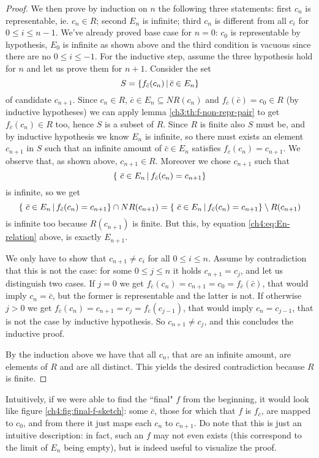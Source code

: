 \begin{proof}
	We then prove by induction on $n$ the following three statements: first $c_n$ is representable, ie. $c_n \in R$; second $E_n$ is infinite; third $c_n$ is different from all $c_i$ for $0 \le i \le n - 1$.
	We've already proved base case for $n = 0$: $c_0$ is representable by hypothesis, $E_0$ is infinite as shown above and the third condition is vacuous since there are no $0 \le i \le -1$.
	For the inductive step, assume the three hypothesis hold for $n$ and let us prove them for $n + 1$.
	Consider the set
	\[
	S = \{ f_{\bar{c}}(c_n) \,\vert\, \bar{c} \in E_n \}
	\]
	of candidate $c_{n+1}$.
	Since $c_n \in R$, $\bar{c} \in E_n \subseteq NR(c_n)$ and $f_{\bar{c}}(\bar{c}) = c_0 \in R$ (by inductive hypotheses) we can apply lemma \ref{ch3:th:f-non-repr-pair} to get $f_{\bar{c}}(c_n) \in R$ too, hence $S$ is a subset of $R$.
	Since $R$ is finite also $S$ must be, and by inductive hypothesis we know $E_n$ is infinite, so there must exists an element $c_{n+1}$ in $S$ such that an infinite amount of $\bar{c} \in E_n$ satisfies $f_{\bar{c}}(c_n) = c_{n+1}$. We observe that, as shown above, $c_{n+1} \in R$. Moreover we chose $c_{n+1}$ such that
	\[
	\{\ \bar{c} \in E_n \,\vert\, f_{\bar{c}}(c_n) = c_{n+1} \}
	\]
	is infinite, so we get
	\[
	\{\ \bar{c} \in E_n \,\vert\, f_{\bar{c}}(c_n) = c_{n+1} \} \cap NR(c_{n+1}) = \{\ \bar{c} \in E_n \,\vert\, f_{\bar{c}}(c_n) = c_{n+1} \} \setminus R(c_{n+1})
	\]
	is infinite too because $R(c_{n+1})$ is finite. But this, by equation \eqref{ch4:eq:En-relation} above, is exactly $E_{n+1}$.

	We only have to show that $c_{n+1} \neq c_i$ for all $0 \le i \le n$. Assume by contradiction that this is not the case: for some $0 \le j \le n$ it holds $c_{n+1} = c_j$, and let us distinguish two cases. If $j = 0$ we get $f_{\bar{c}}(c_n) = c_{n+1} = c_0 = f_{\bar{c}}(\bar{c})$, that would imply $c_n = \bar{c}$, but the former is representable and the latter is not. If otherwise $j > 0$ we get $f_{\bar{c}}(c_n) = c_{n+1} = c_j = f_{\bar{c}}(c_{j-1})$, that would imply $c_n = c_{j-1}$, that is not the case by inductive hypothesis. So $c_{n+1} \neq c_j$, and this concludes the inductive proof.

	By the induction above we have that all $c_n$, that are an infinite amount, are elements of $R$ and are all distinct. This yields the desired contradiction because $R$ is finite.
\end{proof}

Intuitively, if we were able to find the ``final" $f$ from the beginning, it would look like figure \ref{ch4:fig:final-f-sketch}: some $\bar{c}$, those for which that $f$ is $f_{\bar{c}}$, are mapped to $c_0$, and from there it just maps each $c_n$ to $c_{n+1}$. Do note that this is just an intuitive description: in fact, such an $f$ may not even exists (this correspond to the limit of $E_n$ being empty), but is indeed useful to visualize the proof.

